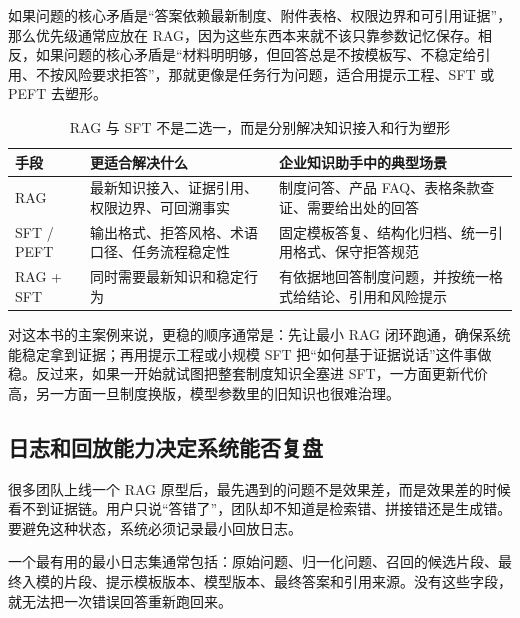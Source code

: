 如果问题的核心矛盾是“答案依赖最新制度、附件表格、权限边界和可引用证据”，那么优先级通常应放在 RAG，因为这些东西本来就不该只靠参数记忆保存。相反，如果问题的核心矛盾是“材料明明够，但回答总是不按模板写、不稳定给引用、不按风险要求拒答”，那就更像是任务行为问题，适合用提示工程、SFT 或 PEFT 去塑形。

\begin{table}[H]
\centering
\small
\begin{tabularx}{\textwidth}{>{\raggedright\arraybackslash}p{2.8cm}>{\raggedright\arraybackslash}p{3.2cm}>{\raggedright\arraybackslash}X}
\toprule
\textbf{手段} & \textbf{更适合解决什么} & \textbf{企业知识助手中的典型场景} \\
\midrule
RAG & 最新知识接入、证据引用、权限边界、可回溯事实 & 制度问答、产品 FAQ、表格条款查证、需要给出处的回答 \\
SFT / PEFT & 输出格式、拒答风格、术语口径、任务流程稳定性 & 固定模板答复、结构化归档、统一引用格式、保守拒答规范 \\
RAG + SFT & 同时需要最新知识和稳定行为 & 有依据地回答制度问题，并按统一格式给结论、引用和风险提示 \\
\bottomrule
\end{tabularx}
\caption{RAG 与 SFT 不是二选一，而是分别解决知识接入和行为塑形}
\label{tab:rag-vs-sft}
\end{table}

对这本书的主案例来说，更稳的顺序通常是：先让最小 RAG 闭环跑通，确保系统能稳定拿到证据；再用提示工程或小规模 SFT 把“如何基于证据说话”这件事做稳。反过来，如果一开始就试图把整套制度知识全塞进 SFT，一方面更新代价高，另一方面一旦制度换版，模型参数里的旧知识也很难治理。

\subsection{日志和回放能力决定系统能否复盘}
很多团队上线一个 RAG 原型后，最先遇到的问题不是效果差，而是效果差的时候看不到证据链。用户只说“答错了”，团队却不知道是检索错、拼接错还是生成错。要避免这种状态，系统必须记录最小回放日志。

一个最有用的最小日志集通常包括：原始问题、归一化问题、召回的候选片段、最终入模的片段、提示模板版本、模型版本、最终答案和引用来源。没有这些字段，就无法把一次错误回答重新跑回来。

